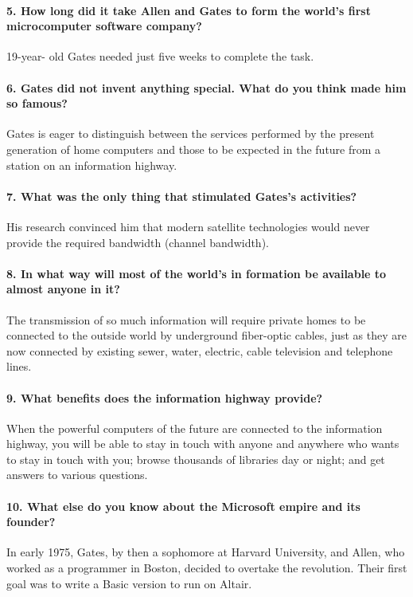     \paragraph{5. How long did it take Allen and Gates to form the world's first microcomputer software company?}
    19-year- old Gates needed just five weeks to complete the task.
    
    \paragraph{6. Gates did not invent anything special. What do you think made him so famous?}
    Gates is eager to distinguish between the services performed by the present generation of home computers and those to be expected in the future from a station on an information highway.
    
    \paragraph{7. What was the only thing that stimulated Gates's activities?}
    His research convinced him that modern satellite technologies would never provide the required bandwidth (channel bandwidth).
    
    \paragraph{8. In what way will most of the world's in formation be available to almost anyone in it?}
    The transmission of so much information will require private homes to be connected to the outside world by underground fiber-optic cables, just as they are now connected by existing sewer, water, electric, cable television and telephone lines.
    
    \paragraph{9. What benefits does the information highway provide?}
    When the powerful computers of the future are connected to the information highway, you will be able to stay in touch with anyone and anywhere who wants to stay in touch with you; browse thousands of libraries day or night; and get answers to various questions.
    
    \paragraph{10. What else do you know about the Microsoft empire and its founder?}
    In early 1975, Gates, by then a sophomore at Harvard University, and Allen, who worked as a programmer in Boston, decided to overtake the revolution. Their first goal was to write a Basic version to run on Altair.
    

